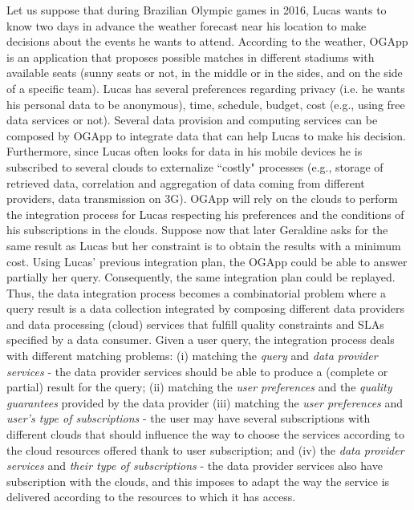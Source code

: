 Let us suppose that during Brazilian Olympic games in 2016, Lucas wants to know two days in advance the weather forecast near his  location to make decisions about the events he wants to attend. According to the weather, OGApp is an application that proposes possible matches  in different stadiums with available seats   (sunny seats or not, in the middle or in the sides, and on the side of a specific team).
%
 Lucas has several preferences regarding privacy  (i.e. he wants his personal data to be anonymous), time, schedule, budget, cost (e.g., using free data services or not). Several data provision and computing services  can be composed by OGApp to integrate data that can help Lucas to make his decision. Furthermore, since Lucas often looks for data in his mobile devices he is subscribed to several clouds to externalize ``costly"  processes (e.g., storage of retrieved data, correlation and aggregation of data coming from different providers, data transmission on 3G). 
%
OGApp will rely on the clouds to perform the integration process for Lucas respecting his preferences and the conditions of his subscriptions in the clouds. 
%
%
Suppose now that later Geraldine asks for the same result as Lucas but her constraint is to obtain the results with a minimum cost. Using Lucas' previous integration plan, the OGApp could be able to answer partially her query. Consequently, the same integration plan could be replayed.
%
%
Thus, the data integration process becomes a combinatorial problem where a query result is a data collection integrated  by composing different data providers and data processing (cloud) services that fulfill quality constraints and SLAs specified by a data consumer.
Given a user query, the integration process deals with different matching problems: 
(i) matching the \textit{query} and \textit{data provider services} - the data provider services should be able to produce a (complete or partial) result for the query; 
(ii) matching the \textit{user preferences} and the \textit{quality guarantees} provided by the data provider
(iii) matching the \textit{user preferences} and \textit{user's type of subscriptions} - the user may have several subscriptions with different clouds that should influence the way to choose the services according to the cloud resources offered thank to user subscription; and 
(iv) the \textit{data provider services} and \textit{their type of subscriptions} - the data provider services also have  subscription with the clouds, and this imposes to adapt the way the service is delivered according to the resources to which it has access.


